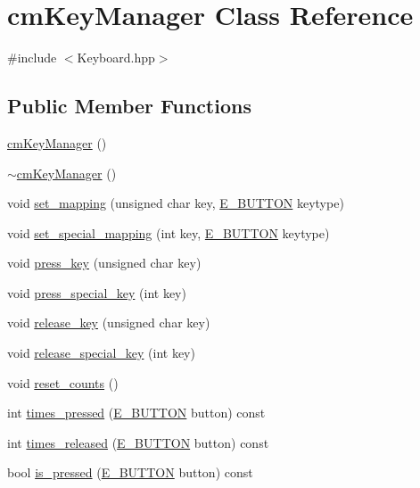 \hypertarget{classcm_key_manager}{\section{cm\-Key\-Manager Class Reference}
\label{classcm_key_manager}
}


{\ttfamily \#include $<$Keyboard.\-hpp$>$}

\subsection*{Public Member Functions}
\begin{DoxyCompactItemize}
\item 
\hyperlink{classcm_key_manager_a79ae9754c7fe3ea67f6c8184adf90691}{cm\-Key\-Manager} ()
\item 
\hyperlink{classcm_key_manager_a0c96493d3fd7fa83e74dae732cc18df3}{$\sim$cm\-Key\-Manager} ()
\item 
void \hyperlink{classcm_key_manager_abb23711c55b58fed5a85d4ab59b1a8ff}{set\-\_\-mapping} (unsigned char key, \hyperlink{_keyboard_8hpp_ad4a278e59ed8d2af129f9b88eaa342ae}{E\-\_\-\-B\-U\-T\-T\-O\-N} keytype)
\item 
void \hyperlink{classcm_key_manager_aa70f8c04d16bcd19f99dd0117d3b5cd0}{set\-\_\-special\-\_\-mapping} (int key, \hyperlink{_keyboard_8hpp_ad4a278e59ed8d2af129f9b88eaa342ae}{E\-\_\-\-B\-U\-T\-T\-O\-N} keytype)
\item 
void \hyperlink{classcm_key_manager_a62fe4906c92806bafc66f37a5dcd63f1}{press\-\_\-key} (unsigned char key)
\item 
void \hyperlink{classcm_key_manager_ae8f67f69903df93356cf0a36be42f8c2}{press\-\_\-special\-\_\-key} (int key)
\item 
void \hyperlink{classcm_key_manager_a3c3daabf86791170d0db86491dda289c}{release\-\_\-key} (unsigned char key)
\item 
void \hyperlink{classcm_key_manager_ae8f80f4a5ff0a6e11ad0a06fc855a960}{release\-\_\-special\-\_\-key} (int key)
\item 
void \hyperlink{classcm_key_manager_a4a346eef64306328b72f5ce245bf8788}{reset\-\_\-counts} ()
\item 
int \hyperlink{classcm_key_manager_a5fa0ab83e8f36c9a721794c17fb13cb1}{times\-\_\-pressed} (\hyperlink{_keyboard_8hpp_ad4a278e59ed8d2af129f9b88eaa342ae}{E\-\_\-\-B\-U\-T\-T\-O\-N} button) const 
\item 
int \hyperlink{classcm_key_manager_af5d00cb2ad3b1c6350b5486cb2ec27ee}{times\-\_\-released} (\hyperlink{_keyboard_8hpp_ad4a278e59ed8d2af129f9b88eaa342ae}{E\-\_\-\-B\-U\-T\-T\-O\-N} button) const 
\item 
bool \hyperlink{classcm_key_manager_af97cb352de7f7e88efb2beb56a2c68d2}{is\-\_\-pressed} (\hyperlink{_keyboard_8hpp_ad4a278e59ed8d2af129f9b88eaa342ae}{E\-\_\-\-B\-U\-T\-T\-O\-N} button) const 
\end{DoxyCompactItemize}


